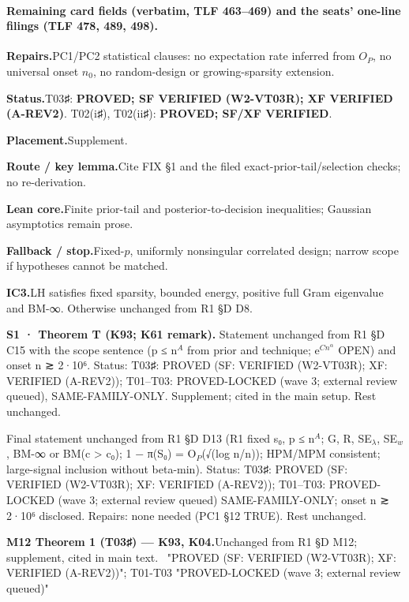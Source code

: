 \paragraph{Remaining card fields (verbatim, TLF 463–469) and the seats' one-line filings (TLF 478, 489, 498).}
{\small
\par\smallskip\noindent\textbf{Repairs.}\enspace PC1/PC2 statistical clauses: no expectation rate inferred from \(O_P\), no universal onset \(n_0\), no random-design or growing-sparsity extension.
\par\smallskip\noindent\textbf{Status.}\enspace T03♯: \textbf{PROVED; SF VERIFIED (W2-VT03R); XF VERIFIED (A-REV2)}. T02(i♯), T02(ii♯): \textbf{PROVED; SF/XF VERIFIED}.
\par\smallskip\noindent\textbf{Placement.}\enspace Supplement.
\par\smallskip\noindent\textbf{Route / key lemma.}\enspace Cite FIX §1 and the filed exact-prior-tail/selection checks; no re-derivation.
\par\smallskip\noindent\textbf{Lean core.}\enspace Finite prior-tail and posterior-to-decision inequalities; Gaussian asymptotics remain prose.
\par\smallskip\noindent\textbf{Fallback / stop.}\enspace Fixed-\(p\), uniformly nonsingular correlated design; narrow scope if hypotheses cannot be matched.
\par\smallskip\noindent\textbf{IC3.}\enspace LH satisfies fixed sparsity, bounded energy, positive full Gram eigenvalue and BM-∞. Otherwise unchanged from R1 §D D8.
\par\noindent \textbf{S1 · Theorem T (K93; K61 remark).} Statement unchanged from R1 §D C15 with the scope sentence (p ≤ n$^{A}$ from prior and technique; e$^{Cn^{α}}$ OPEN) and onset n ≳ 2·10⁶. Status: T03♯: PROVED (SF: VERIFIED (W2-VT03R); XF: VERIFIED (A-REV2)); T01–T03: PROVED-LOCKED (wave 3; external review queued), SAME-FAMILY-ONLY. Supplement; cited in the main setup. Rest unchanged.
\par\noindent Final statement unchanged from R1 §D D13 (R1 fixed s₀, p ≤ n$^{A}$; G, R, SE$_{λ}$, SE$_{w}$, BM-∞ or BM(c \textgreater{} c₀); 1 − π(S₀) = O$_{P}$(√(log n/n)); HPM/MPM consistent; large-signal inclusion without beta-min). Status: T03♯: PROVED (SF: VERIFIED (W2-VT03R); XF: VERIFIED (A-REV2)); T01–T03: PROVED-LOCKED (wave 3; external review queued) SAME-FAMILY-ONLY; onset n ≳ 2·10⁶ disclosed. Repairs: none needed (PC1 §12 TRUE). Rest unchanged.
\par\smallskip\noindent\textbf{M12 Theorem 1 (T03♯) — K93, K04.}\enspace Unchanged from R1 §D M12; supplement, cited in main text. \textbar\ "PROVED (SF: VERIFIED (W2-VT03R); XF: VERIFIED (A-REV2))"; T01-T03 "PROVED-LOCKED (wave 3; external review queued)"
}

